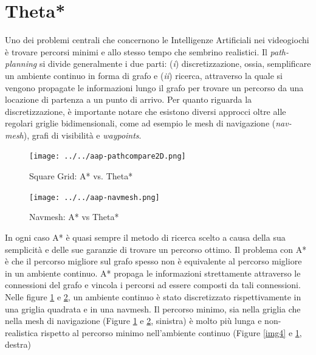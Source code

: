 \documentclass[11pt]{book}
\begin{document}
\section{Theta*}

\label{sec:theta}

\par{Uno dei problemi centrali che concernono le Intelligenze Artificiali nei videogiochi \`e trovare percorsi minimi e allo stesso tempo che sembrino realistici. Il \emph{path-planning} si divide generalmente i due parti: (\emph{i}) discretizzazione, ossia, semplificare un ambiente continuo in forma di grafo e (\emph{ii}) ricerca, attraverso la quale si vengono propagate le informazioni lungo il grafo per trovare un percorso da una locazione di partenza a un punto di arrivo. Per quanto riguarda la discretizzazione, \`e importante notare che esistono diversi approcci oltre alle regolari griglie bidimensionali, come ad esempio le mesh di navigazione (\emph{nav-mesh}), grafi di visibilit\`a e  \emph{waypoints}.}

\begin{figure}[htp]
\centering
\texttt{[image: ../../aap-pathcompare2D.png]}
\caption{Square Grid: A* vs. Theta* }
\label{img5}
\end{figure}

\begin{figure}[htp]
\centering
\texttt{[image: ../../aap-navmesh.png]}
\caption{Navmesh: A* vs Theta*}
\label{img6}
\end{figure}

\par{In ogni caso A* \`e quasi sempre il metodo di ricerca scelto a causa della sua semplicit\`a e delle sue garanzie di trovare un percorso ottimo. Il problema con A* \`e che il percorso migliore sul grafo spesso non \`e equivalente al percorso migliore in un ambiente continuo. A* propaga le informazioni strettamente attraverso le connessioni del grafo e vincola i percorsi ad essere composti da tali connessioni. Nelle figure \ref{img5} e \ref{img6}, un ambiente continuo \`e stato discretizzato rispettivamente in una griglia quadrata e in una navmesh. Il percorso minimo, sia nella griglia che nella mesh di navigazione (Figure \ref{img5} e \ref{img6}, sinistra) \`e molto pi\`u lunga e non-realistica rispetto al percorso minimo nell'ambiente continuo (Figure \ref{img4} e \ref{img5}, destra)}
\end{document}
